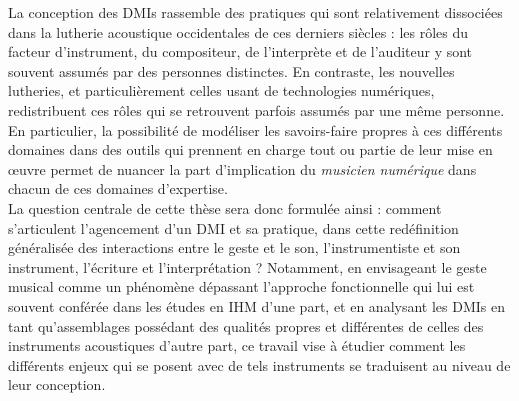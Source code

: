 \noindent La conception des \glspl{DMI} rassemble des pratiques qui sont relativement dissociées dans la lutherie acoustique occidentales de ces derniers siècles : les rôles du facteur d'instrument, du compositeur, de l'interprète et de l'auditeur y sont souvent assumés par des personnes distinctes. En contraste, les nouvelles lutheries, et particulièrement celles usant de technologies numériques, redistribuent 
ces rôles qui se retrouvent parfois assumés par une même personne. En particulier, la possibilité de modéliser les savoirs-faire propres à ces différents domaines dans des outils qui prennent en charge tout ou partie de leur mise en œuvre permet de nuancer la part d'implication du \textit{musicien numérique} dans chacun de ces domaines d'expertise.\\
\indent La question centrale de cette thèse sera donc formulée ainsi : comment s'articulent l'agencement d'un \gls{DMI} et sa pratique, dans cette redéfinition généralisée des interactions entre le geste et le son, l'instrumentiste et son instrument, l'écriture et l'interprétation ? Notamment, en envisageant le geste musical comme un phénomène dépassant l'approche fonctionnelle qui lui est souvent conférée dans les études en \gls{IHM} d'une part, et en analysant les \glspl{DMI} en tant qu'assemblages possédant des qualités propres et différentes de celles des instruments acoustiques d'autre part, ce travail vise à étudier comment les différents enjeux qui se posent avec de tels instruments se traduisent au niveau de leur conception.

